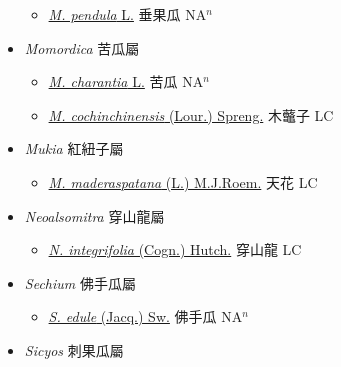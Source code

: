 \begin{itemize}
  \begin{itemize}
        \item[] \href{http://www.theplantlist.org/tpl1.1/search?q=Melothria+pendula}{\textit{M. pendula} L.}   垂果瓜 NA$^n$
  \end{itemize}
 \item[] \textit{Momordica} 苦瓜屬
                    
  \begin{itemize}
        \item[] \href{http://www.theplantlist.org/tpl1.1/search?q=Momordica+charantia}{\textit{M. charantia} L.}   苦瓜 NA$^n$
        \item[] \href{http://www.theplantlist.org/tpl1.1/search?q=Momordica+cochinchinensis}{\textit{M. cochinchinensis} (Lour.) Spreng.}   木虌子 LC
  \end{itemize}
 \item[] \textit{Mukia} 紅紐子屬
                    
  \begin{itemize}
        \item[] \href{http://www.theplantlist.org/tpl1.1/search?q=Mukia+maderaspatana}{\textit{M. maderaspatana} (L.) M.J.Roem.}   天花 LC
  \end{itemize}
 \item[] \textit{Neoalsomitra} 穿山龍屬
                    
  \begin{itemize}
        \item[] \href{http://www.theplantlist.org/tpl1.1/search?q=Neoalsomitra+integrifolia}{\textit{N. integrifolia} (Cogn.) Hutch.}   穿山龍 LC
  \end{itemize}
 \item[] \textit{Sechium} 佛手瓜屬
                    
  \begin{itemize}
        \item[] \href{http://www.theplantlist.org/tpl1.1/search?q=Sechium+edule}{\textit{S. edule} (Jacq.) Sw.}   佛手瓜 NA$^n$
  \end{itemize}
 \item[] \textit{Sicyos} 刺果瓜屬
                    

\end{itemize}
